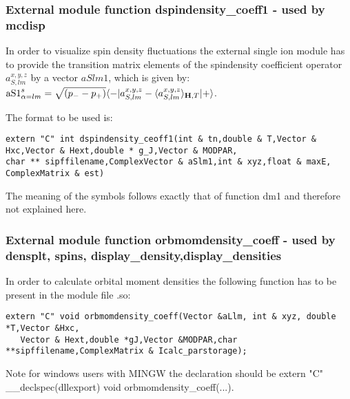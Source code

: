 \subsubsection{External module function {\prg dspindensity\_coeff1} - used by {\prg mcdisp}}

In order to visualize spin density  fluctuations 
 the external single ion module has to provide the transition
matrix elements of the spindensity coefficient operator $a^{x,y,z}_{S,lm}$ by a
vector $aSlm1$, which is given by:
 ${\rm aS1}^s_{\alpha=lm}=\sqrt{(p_--p_+)}\langle -|a^{x,y,z}_{S,lm}-\langle a^{x,y,z}_{S,lm}\rangle_{\mathbf H,T}|+\rangle$. 

The format to be used is:
{\footnotesize
\begin{verbatim}
extern "C" int dspindensity_ceoff1(int & tn,double & T,Vector & Hxc,Vector & Hext,double * g_J,Vector & MODPAR,
char ** sipffilename,ComplexVector & aSlm1,int & xyz,float & maxE, ComplexMatrix & est)
\end{verbatim}
}
The meaning of the symbols follows exactly that of function 
{\prg dm1} and therefore not explained here.


\subsubsection{External module function {\prg orbmomdensity\_coeff} -
used by {\prg densplt},
{\prg spins},
{\prg display\_density},{\prg display\_densities}}


In order to calculate orbital moment densities
the following function has to be
present in the module file {\prg *.so}:

\begin{verbatim}
extern "C" void orbmomdensity_coeff(Vector &aLlm, int & xyz, double *T,Vector &Hxc, 
   Vector & Hext,double *gJ,Vector &MODPAR,char **sipffilename,ComplexMatrix & Icalc_parstorage);
\end{verbatim}

Note for windows users with MINGW the declaration should be {\prg extern "C" \_\_declspec(dllexport) void %
orbmomdensity\_coeff(...)}.

